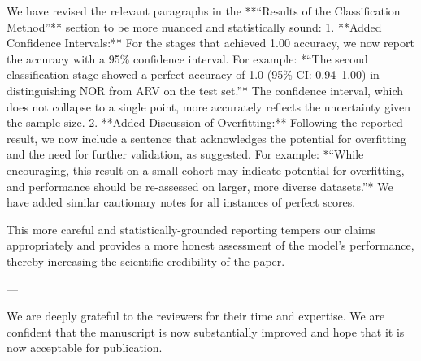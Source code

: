     We have revised the relevant paragraphs in the **“Results of the Classification Method”** section to be more nuanced and statistically sound:
    1.  **Added Confidence Intervals:** For the stages that achieved 1.00 accuracy, we now report the accuracy with a 95\% confidence interval. For example: *“The second classification stage showed a perfect accuracy of 1.0 (95\% CI: 0.94–1.00) in distinguishing NOR from ARV on the test set.”* The confidence interval, which does not collapse to a single point, more accurately reflects the uncertainty given the sample size.
    2.  **Added Discussion of Overfitting:** Following the reported result, we now include a sentence that acknowledges the potential for overfitting and the need for further validation, as suggested. For example: *“While encouraging, this result on a small cohort may indicate potential for overfitting, and performance should be re-assessed on larger, more diverse datasets.”* We have added similar cautionary notes for all instances of perfect scores.

    This more careful and statistically-grounded reporting tempers our claims appropriately and provides a more honest assessment of the model's performance, thereby increasing the scientific credibility of the paper.

---

We are deeply grateful to the reviewers for their time and expertise. We are confident that the manuscript is now substantially improved and hope that it is now acceptable for publication.